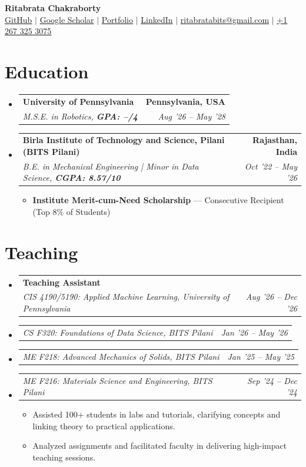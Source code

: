 \documentclass[letterpaper,10pt]{article}
\makeatletter
\newcommand{\resumeItem}[1]{
  \item \small{#1\vspace{-2pt}}
}
\newcommand{\resumeSubheading}[4]{
  \vspace{0pt}\item
  \begin{tabular*}{0.97\textwidth}[t]{l@{\extracolsep{\fill}}r}
    \textbf{#1} & \textbf{#2} \\
    \textit{\small #3} & \textit{\small #4} \\
  \end{tabular*}\vspace{-6pt}
}
\newcommand{\resumeSubSubheading}[2]{
  \vspace{0pt}\item
  \begin{tabular*}{0.97\textwidth}[t]{l@{\extracolsep{\fill}}r}
    \textit{\small #1} & \textit{\small #2} \\
  \end{tabular*}\vspace{-6pt}
}
\newcommand{\resumeSubHeadingListStart}{
  \begin{itemize}[leftmargin=0.10in, label={}]\vspace{6pt}
}
\newcommand{\resumeSubHeadingListEnd}{
  \end{itemize}
}
\newcommand{\resumeItemListStart}{
  \begin{itemize}[leftmargin=0.18in]
}
\newcommand{\resumeItemListEnd}{
  \end{itemize}\vspace{-6pt}
}
\makeatother
\begin{document}
\begin{center}
  \textbf{\huge Ritabrata Chakraborty} \\ [6pt]
  \small
  {\color{blue}\href{https://github.com/robotics1106}{GitHub} $|$
  \href{https://scholar.google.com/citations?user=JikCewwAAAAJ&hl=en}{Google Scholar} $|$
  \href{https://robotics1106.github.io/Portfolio/}{Portfolio} $|$
  \href{https://www.linkedin.com/in/rc14372}{LinkedIn} $|$
  \href{mailto:ritabratabits@gmail.com}{ritabratabits@gmail.com} $|$ \href{tel:+12673253075}{+1 267 325 3075}}
\end{center}

\section{Education}
\resumeSubHeadingListStart
  \resumeSubheading
    {University of Pennsylvania}{Pennsylvania, USA}
    {M.S.E. in Robotics, \textbf{GPA: --/4}}{Aug '26 – May '28}
  \resumeSubheading
    {Birla Institute of Technology and Science, Pilani (BITS Pilani)}{Rajasthan, India}
    {B.E. in Mechanical Engineering | Minor in Data Science, \textbf{CGPA: 8.57/10}}{Oct '22 – May '26}
    \resumeItemListStart
      \resumeItem{\textbf{Institute Merit-cum-Need Scholarship} — Consecutive Recipient (Top 8\% of Students)}
    \resumeItemListEnd
\resumeSubHeadingListEnd

\section{Teaching}
\resumeSubHeadingListStart
  \resumeSubheading
    {Teaching Assistant}{}
    {CIS 4190/5190: Applied Machine Learning, University of Pennsylvania}{Aug '26 – Dec '26}

    \resumeSubSubheading
      {CS F320: Foundations of Data Science, BITS Pilani}{Jan '26 – May '26}

    \resumeSubSubheading
      {ME F218: Advanced Mechanics of Solids, BITS Pilani}{Jan '25 – May '25}

    \resumeSubSubheading
      {ME F216: Materials Science and Engineering, BITS Pilani}{Sep '24 – Dec '24}

  \resumeItemListStart
    \resumeItem{Assisted 100+ students in labs and tutorials, clarifying concepts and linking theory to practical applications.}
    \resumeItem{Analyzed assignments and facilitated faculty in delivering high-impact teaching sessions.}
  \resumeItemListEnd
\resumeSubHeadingListEnd
\end{document}

